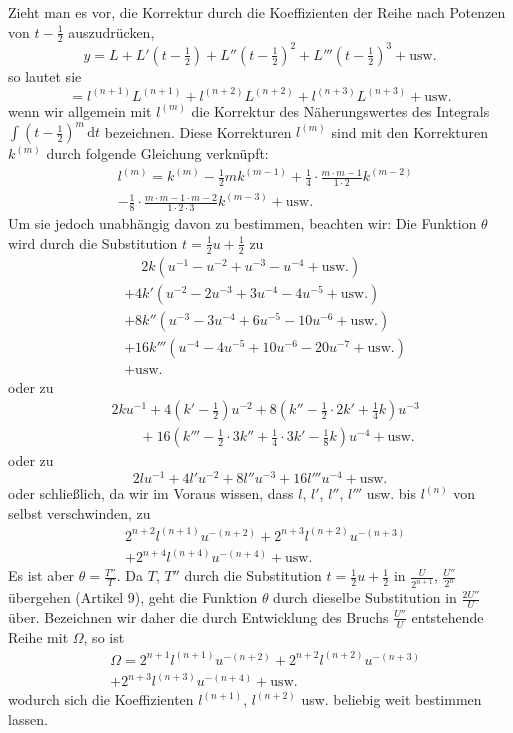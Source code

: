 Zieht man es vor, die Korrektur durch die Koeffizienten der Reihe nach Potenzen von $t-\tfrac12$ auszudrücken,
\[
y=L+L'(t-\tfrac12)+L''(t-\tfrac12)^2+L'''(t-\tfrac12)^3+\text{usw.}
\]
so lautet sie
\[
=l^{(n+1)}L^{(n+1)}+l^{(n+2)}L^{(n+2)}+l^{(n+3)}L^{(n+3)}+\text{usw.}
\]
wenn wir allgemein mit $l^{(m)}$ die Korrektur des Näherungswertes des Integrals $\int(t-\tfrac12)^m\,\mathrm{d}t$ bezeichnen. Diese Korrekturen $l^{(m)}$ sind mit den Korrekturen $k^{(m)}$ durch folgende Gleichung verknüpft:
\[
\begin{aligned}&l^{(m)}=k^{(m)}-\tfrac12mk^{(m-1)}+\tfrac14\cdot\frac{m\cdot m-1}{1\cdot2}k^{(m-2)}\\ &-\tfrac18\cdot\frac{m\cdot m-1\cdot m-2}{1\cdot2\cdot3}k^{(m-3)}+\text{usw.}\end{aligned}
\]
Um sie jedoch unabhängig davon zu bestimmen, beachten wir: Die Funktion $\theta$ wird durch die Substitution $t=\tfrac12u+\tfrac12$ zu
\[
\begin{aligned}
&\phantom{{}+{}}2k(u^{-1}-u^{-2}+u^{-3}-u^{-4}+\text{usw.})\\
&+4k'(u^{-2}-2u^{-3}+3u^{-4}-4u^{-5}+\text{usw.})\\
&+8k''(u^{-3}-3u^{-4}+6u^{-5}-10u^{-6}+\text{usw.})\\
&+16k'''(u^{-4}-4u^{-5}+10u^{-6}-20u^{-7}+\text{usw.})\\
&+\text{usw.}
\end{aligned}
\]
oder zu
\[
\begin{aligned}
&2ku^{-1}+4(k'-\tfrac12)u^{-2}+8(k''-\tfrac12\cdot2k'+\tfrac14k)u^{-3}\\
&\qquad+16(k'''-\tfrac12\cdot3k''+\tfrac14\cdot3k'-\tfrac18k)u^{-4}+\text{usw.}
\end{aligned}
\]
oder zu
\[
2lu^{-1}+4l'u^{-2}+8l''u^{-3}+16l'''u^{-4}+\text{usw.}
\]
oder schließlich, da wir im Voraus wissen, dass $l$, $l'$, $l''$, $l'''$ usw. bis $l^{(n)}$ von selbst verschwinden, zu
\[
\begin{aligned}&2^{n+2}l^{(n+1)}u^{-(n+2)}+2^{n+3}l^{(n+2)}u^{-(n+3)}\\ &+2^{n+4}l^{(n+4)}u^{-(n+4)}+\text{usw.}\end{aligned}
\]
Es ist aber $\theta=\frac{T''}{T}$. Da $T$, $T''$ durch die Substitution $t=\tfrac12u+\tfrac12$ in $\frac{U}{2^{n+1}}$, $\frac{U''}{2^n}$ übergehen (Artikel 9), geht die Funktion $\theta$ durch dieselbe Substitution in $\frac{2U''}{U}$ über. Bezeichnen wir daher die durch Entwicklung des Bruchs $\frac{U''}{U}$ entstehende Reihe mit $\Omega$, so ist
\[
\begin{aligned}&\Omega=2^{n+1}l^{(n+1)}u^{-(n+2)}+2^{n+2}l^{(n+2)}u^{-(n+3)}\\ &+2^{n+3}l^{(n+3)}u^{-(n+4)}+\text{usw.}\end{aligned}
\]
wodurch sich die Koeffizienten $l^{(n+1)}$, $l^{(n+2)}$ usw. beliebig weit bestimmen lassen.

